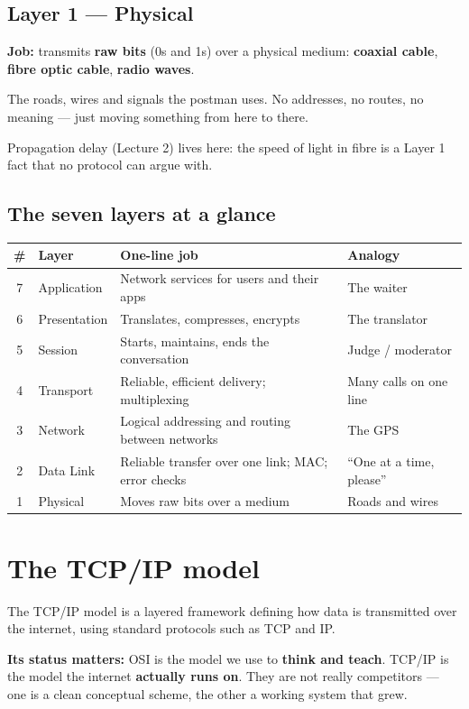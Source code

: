 \subsection{Layer 1 --- Physical}
\textbf{Job:} transmits \textbf{raw bits} (0s and 1s) over a physical medium: \textbf{coaxial cable}, \textbf{fibre optic cable}, \textbf{radio waves}.
\begin{analogy}
The roads, wires and signals the postman uses. No addresses, no routes, no meaning --- just moving something from here to there.
\end{analogy}
Propagation delay (Lecture 2) lives here: the speed of light in fibre is a Layer 1 fact that no protocol can argue with.

\subsection{The seven layers at a glance}
\begin{center}
\begin{tabularx}{\textwidth}{c l X l}
\toprule
\# & Layer & One-line job & Analogy \\
\midrule
7 & Application & Network services for users and their apps & The waiter \\
6 & Presentation & Translates, compresses, encrypts & The translator \\
5 & Session & Starts, maintains, ends the conversation & Judge / moderator \\
4 & Transport & Reliable, efficient delivery; multiplexing & Many calls on one line \\
3 & Network & Logical addressing and routing between networks & The GPS \\
2 & Data Link & Reliable transfer over one link; MAC; error checks & ``One at a time, please'' \\
1 & Physical & Moves raw bits over a medium & Roads and wires \\
\bottomrule
\end{tabularx}
\end{center}

\section{The TCP/IP model}

The TCP/IP model is a layered framework defining how data is transmitted over the internet, using standard protocols such as TCP and IP.

\textbf{Its status matters:} OSI is the model we use to \textbf{think and teach}. TCP/IP is the model the internet \textbf{actually runs on}. They are not really competitors --- one is a clean conceptual scheme, the other a working system that grew.

